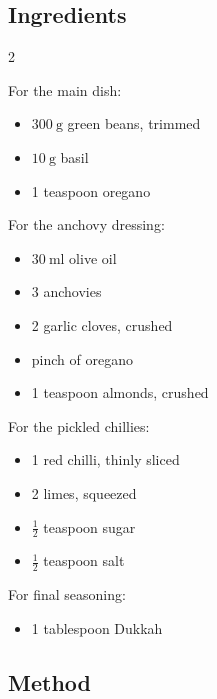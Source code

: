 \documentclass[11pt,a4paper]{article}
\begin{document}
\subsection*{Ingredients}

\begin{multicols}{2}

For the main dish:

\begin{itemize}
  \item $ \qty{300}{\gram} $ green beans, trimmed
  \item $ \qty{10}{\gram} $ basil
  \item 1 teaspoon oregano
\end{itemize}

For the anchovy dressing:

\begin{itemize}
  \item $ \qty{30}{\ml} $ olive oil
  \item 3 anchovies
  \item 2 garlic cloves, crushed
  \item pinch of oregano
  \item 1 teaspoon almonds, crushed
\end{itemize}

\columnbreak{}

For the pickled chillies:

\begin{itemize}
  \item 1 red chilli, thinly sliced
  \item 2 limes, squeezed
  \item $ \frac{1}{2} $ teaspoon sugar
  \item $ \frac{1}{2} $ teaspoon salt
\end{itemize}

For final seasoning:

\begin{itemize}
  \item 1 tablespoon Dukkah
\end{itemize}

\end{multicols}

\medskip

\subsection*{Method}
\end{document}
